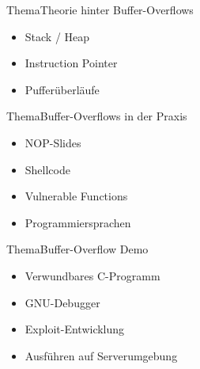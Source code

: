 \begin{frame}{Thema}{Theorie hinter Buffer-Overflows}
    \begin{itemize}
        \item Stack / Heap
        \item Instruction Pointer
        \item Pufferüberläufe
    \end{itemize}
\end{frame}

\begin{frame}{Thema}{Buffer-Overflows in der Praxis}
    \begin{itemize}
        \item NOP-Slides
        \item Shellcode
        \item Vulnerable Functions
        \item Programmiersprachen
    \end{itemize}
\end{frame}

\begin{frame}{Thema}{Buffer-Overflow Demo}
    \begin{itemize}
        \item Verwundbares C-Programm
        \item GNU-Debugger
        \item Exploit-Entwicklung
        \item Ausführen auf Serverumgebung
    \end{itemize}
\end{frame}
